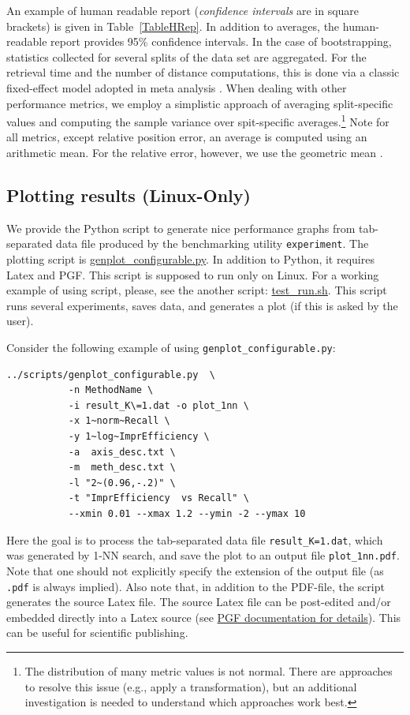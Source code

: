 \documentclass[runningheads,a4paper]{llncs}
\newcommand{\replocfile}{https://github.com/searchivarius/nmslib/blob/v1.5/}
\newcommand{\ttt}[1]{\texttt{#1}}
\begin{document}
{An example of human readable report (\emph{confidence intervals} are in square brackets)
is given in Table~\ref{TableHRep}.
In addition to averages, the human-readable report provides 95\% confidence intervals.
In the case of bootstrapping, statistics collected for several splits of the data set are aggregated.
For the retrieval time and the number of distance computations,
this is done via a classic fixed-effect model adopted in meta analysis \cite{Hedges_and_Vevea:1998}.
When dealing with other performance metrics, 
we employ a simplistic approach of averaging split-specific values
and computing the sample variance over spit-specific averages.\footnote{The distribution
of many metric values is not normal. There are approaches to resolve this issue (e.g., apply a transformation),
but an additional investigation is needed to understand which approaches work best.}
Note for all metrics, except relative position error, an average is computed using an arithmetic mean.
For the relative error, however, we use the geometric mean  \cite{king:1986}.


\subsection{Plotting results (Linux-Only)}\label{SectionGenPlot}
We provide the Python script to generate nice performance graphs 
from tab-separated data file produced by the 
benchmarking utility \ttt{experiment}. 
The plotting script is \href{\replocfile scripts/genplot_configurable.py}{genplot\_configurable.py}.
In addition to Python, it requires Latex and PGF. 
This script is supposed to run only on Linux.
For a working example of using script,
please, see the another script: \href{\replocfile scripts/test_run.sh}{test\_run.sh}.
This script runs several experiments, saves data, and generates a plot (if this is asked by the user).

Consider the following example of using \ttt{genplot\_configurable.py}:
\begin{verbatim}
../scripts/genplot_configurable.py  \
           -n MethodName \
           -i result_K\=1.dat -o plot_1nn \
           -x 1~norm~Recall \
           -y 1~log~ImprEfficiency \
           -a  axis_desc.txt \
           -m  meth_desc.txt \
           -l "2~(0.96,-.2)" \
           -t "ImprEfficiency  vs Recall" \
           --xmin 0.01 --xmax 1.2 --ymin -2 --ymax 10
\end{verbatim}
Here the goal is to process the tab-separated data file \ttt{result\_K=1.dat},
which was generated by 1-NN search, and save the plot to an output file \ttt{plot\_1nn.pdf}.
Note that one should not explicitly specify the extension of the output file (as
\ttt{.pdf} is always implied). Also note that, in addition to the PDF-file,
the script generates the source Latex file. 
The source Latex file can be post-edited and/or embedded directly into a Latex source 
(see \href{http://ftp.fau.de/ctan/graphics/pgf/base/doc/pgfmanual.pdf}{PGF documentation for details}).
This can be useful for scientific publishing.


}
\end{document}
